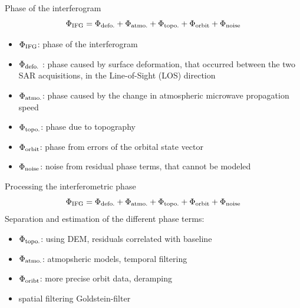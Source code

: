 \documentclass{beamer}
\begin{document}
\begin{frame}{Phase of the interferogram}
    \[
        \Phi_{\text{IFG}} = \Phi_{\text{defo.}} + \Phi_{\text{atmo.}} + \Phi_{\text{topo.}} + \Phi_{\text{orbit}} + \Phi_{\text{noise}}
    \]
    \begin{itemize}
        \item $\Phi_{\text{IFG}}$: phase of the interferogram 
        \item $\Phi_{\text{defo.}}$ : phase caused by surface deformation, that occurred between the two SAR acquisitions, in the Line-of-Sight (LOS) direction
        \item $\Phi_{\text{atmo.}}$: phase caused by the change in atmospheric microwave propagation speed
        \item $\Phi_{\text{topo.}}$: phase due to topography
        \item $\Phi_{\text{orbit}}$: phase from errors of the orbital state vector
        \item $\Phi_{\text{noise}}$: noise from residual phase terms, that cannot be modeled
    \end{itemize}    
\end{frame}

\begin{frame}{Processing the interferometric phase}
    \[
        \Phi_{\text{IFG}} = \Phi_{\text{defo.}} + \Phi_{\text{atmo.}} + \Phi_{\text{topo.}} + \Phi_{\text{orbit}} + \Phi_{\text{noise}}
    \]
    Separation and estimation of the different phase terms:
    \begin{itemize}
        \item $\Phi_{\text{topo.}}$: using DEM, residuals correlated with baseline
        \item $\Phi_{\text{atmo.}}$: atmopsheric models, temporal filtering
        \item $\Phi_{\text{oribt}}$: more precise orbit data, deramping
        \item spatial filtering Goldstein-filter %
    \end{itemize}
\end{frame}
\end{document}
